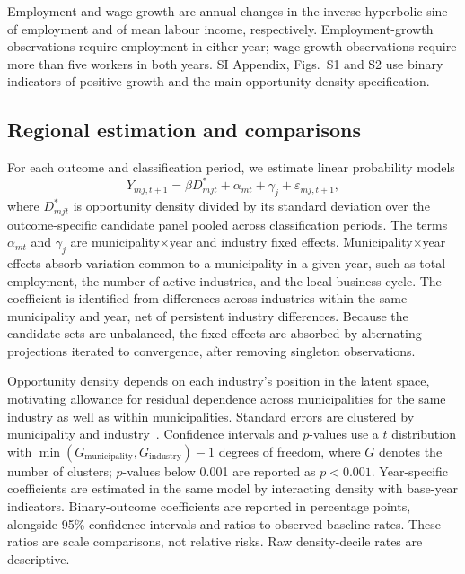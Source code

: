 \documentclass[9pt,twocolumn,twoside]{pnas-new}
\begin{document}
Employment and wage growth are annual changes in the inverse hyperbolic sine of employment and of mean labour income, respectively. Employment-growth observations require employment in either year; wage-growth observations require more than five workers in both years. SI Appendix, Figs.~S1 and S2 use binary indicators of positive growth and the main opportunity-density specification.

\subsection{Regional estimation and comparisons}
\label{subsubsec:regional_regression}

For each outcome and classification period, we estimate linear probability models
\begin{equation}
Y_{mj,t+1}=\beta D^*_{mjt}+\alpha_{mt}+\gamma_j+\varepsilon_{mj,t+1},
\label{eq:regional-main}
\end{equation}
where $D^*_{mjt}$ is opportunity density divided by its standard deviation over the outcome-specific candidate panel pooled across classification periods. The terms $\alpha_{mt}$ and $\gamma_j$ are municipality$\times$year and industry fixed effects. Municipality$\times$year effects absorb variation common to a municipality in a given year, such as total employment, the number of active industries, and the local business cycle. The coefficient is identified from differences across industries within the same municipality and year, net of persistent industry differences. Because the candidate sets are unbalanced, the fixed effects are absorbed by alternating projections iterated to convergence, after removing singleton observations.

Opportunity density depends on each industry's position in the latent space, motivating allowance for residual dependence across municipalities for the same industry as well as within municipalities. Standard errors are clustered by municipality and industry~\cite{cameronRobustInferenceMultiway2011}. Confidence intervals and $p$-values use a $t$ distribution with $\min(G_{\mathrm{municipality}},G_{\mathrm{industry}})-1$ degrees of freedom, where $G$ denotes the number of clusters; $p$-values below 0.001 are reported as $p<0.001$. Year-specific coefficients are estimated in the same model by interacting density with base-year indicators. Binary-outcome coefficients are reported in percentage points, alongside 95\% confidence intervals and ratios to observed baseline rates. These ratios are scale comparisons, not relative risks. Raw density-decile rates are descriptive.
\end{document}
